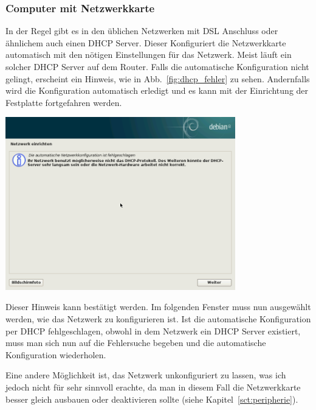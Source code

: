 \documentclass[a4paper,12pt,twoside]{article}
\begin{document}
\subsubsection{Computer mit Netzwerkkarte}
\label{sct:inst_mit_netzwerk}
In der Regel gibt es in den üblichen Netzwerken mit DSL Anschluss oder
ähnlichem auch einen DHCP Server. Dieser Konfiguriert die Netzwerkkarte
automatisch mit den nötigen Einstellungen für das Netzwerk. Meist läuft
ein solcher DHCP Server auf dem Router. Falls die automatische
Konfiguration nicht gelingt, erscheint ein Hinweis, wie in
Abb.~\ref{fig:dhcp_fehler} zu sehen. Andernfalls wird die Konfiguration
automatisch erledigt und es kann mit der Einrichtung der Festplatte
fortgefahren werden.

\begin{minipage}{\textwidth}
    \centering
    \includegraphics[width=10cm]{screenshots/message_dhcp_failed.png}
    \label{fig:dhcp_fehler}
\end{minipage}
\bigskip

Dieser Hinweis kann bestätigt werden. Im folgenden Fenster muss nun
ausgewählt werden, wie das Netzwerk zu konfigurieren ist. Ist die
automatische Konfiguration per DHCP fehlgeschlagen, obwohl in dem
Netzwerk ein DHCP Server existiert, muss man sich nun auf die
Fehlersuche begeben und die automatische Konfiguration wiederholen.

Eine andere Möglichkeit ist, das Netzwerk unkonfiguriert zu lassen, was
ich jedoch nicht für sehr sinnvoll erachte, da man in diesem Fall die
Netzwerkkarte besser gleich ausbauen oder deaktivieren sollte (siehe
Kapitel~\ref{sct:peripherie}).
\end{document}
